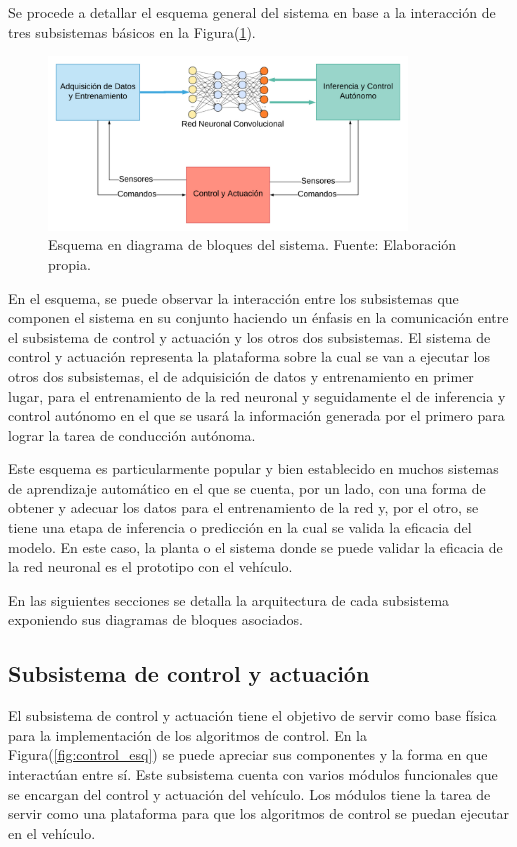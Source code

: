    Se procede a detallar el esquema general del sistema en base a la interacción de tres subsistemas básicos en la Figura(\ref{fig:arquitectura}). 

    \begin{figure}[!h] 
        \centering
        \includegraphics[width=0.85\textwidth]{img/arquitectura}
        \caption[Esquema en diagrama de bloques del sistema]{Esquema en diagrama de bloques del sistema. Fuente: Elaboración propia. }
        \label{fig:arquitectura}
    \end{figure}

    En el esquema, se puede observar la interacción entre los subsistemas que componen el sistema en su conjunto haciendo 
    un énfasis en la comunicación entre el subsistema de control y actuación y los otros dos subsistemas. El sistema de 
    control y actuación representa la plataforma sobre la cual se van a ejecutar los otros dos subsistemas, el de adquisición 
    de datos y entrenamiento en primer lugar, para el entrenamiento de la red neuronal y seguidamente el de inferencia 
    y control autónomo en el que se usará la información generada por el primero para lograr la tarea de conducción autónoma. 
    
    Este esquema es particularmente popular y bien establecido en muchos sistemas de aprendizaje automático en el que se cuenta,
    por un lado, con una forma de obtener y adecuar los datos para el entrenamiento de la red y, por el otro, se tiene una 
    etapa de inferencia o predicción en la cual se valida la eficacia del modelo. En este caso, la planta o el sistema donde 
    se puede validar la eficacia de la red neuronal es el prototipo con el vehículo.

    En las siguientes secciones se detalla la arquitectura de cada subsistema exponiendo sus diagramas de bloques asociados.

    \subsection{Subsistema de control y actuación} \label{sec:esqcontrol}
    El subsistema de control y actuación tiene el objetivo de servir como base física para la implementación de los algoritmos 
    de control. En la Figura(\ref{fig:control_esq}) se puede apreciar sus componentes y la forma en que interactúan entre sí. 
    Este subsistema cuenta con varios módulos funcionales que se encargan del control y actuación del vehículo. Los módulos 
    tiene la tarea de servir como una plataforma para que los algoritmos de control se puedan ejecutar en el vehículo. 

